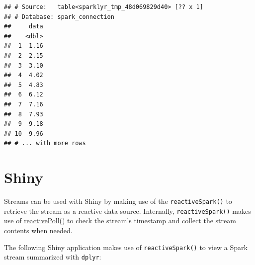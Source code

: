 \documentclass[]{book}
\newenvironment{Shaded}{\begin{snugshade}}{\end{snugshade}}
\newcommand{\ControlFlowTok}[1]{\textcolor[rgb]{0.13,0.29,0.53}{\textbf{#1}}}
\newcommand{\DataTypeTok}[1]{\textcolor[rgb]{0.13,0.29,0.53}{#1}}
\newcommand{\KeywordTok}[1]{\textcolor[rgb]{0.13,0.29,0.53}{\textbf{#1}}}
\newcommand{\NormalTok}[1]{#1}
\newcommand{\OperatorTok}[1]{\textcolor[rgb]{0.81,0.36,0.00}{\textbf{#1}}}
\newcommand{\StringTok}[1]{\textcolor[rgb]{0.31,0.60,0.02}{#1}}
\theoremstyle{definition}
\theoremstyle{definition}
\theoremstyle{definition}
\theoremstyle{remark}
\begin{document}
\begin{verbatim}
## # Source:   table<sparklyr_tmp_48d069829d40> [?? x 1]
## # Database: spark_connection
##     data
##    <dbl>
##  1  1.16
##  2  2.15
##  3  3.10
##  4  4.02
##  5  4.83
##  6  6.12
##  7  7.16
##  8  7.93
##  9  9.18
## 10  9.96
## # ... with more rows
\end{verbatim}

\hypertarget{shiny}{%
\section{Shiny}\label{shiny}}

Streams can be used with Shiny by making use of the
\texttt{reactiveSpark()} to retrieve the stream as a reactive data
source. Internally, \texttt{reactiveSpark()} makes use of
\href{https://shiny.rstudio.com/reference/shiny/latest/reactivePoll.html}{reactivePoll()}
to check the stream's timestamp and collect the stream contents when
needed.

The following Shiny application makes use of \texttt{reactiveSpark()} to
view a Spark stream summarized with \texttt{dplyr}:

\begin{Shaded}
\end{Shaded}
\end{document}
